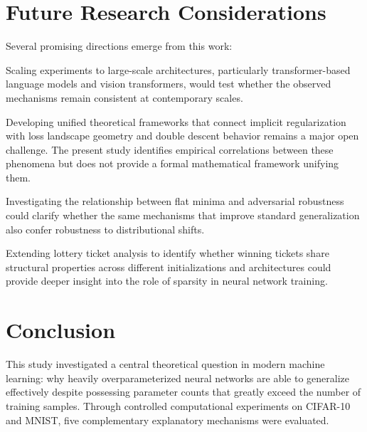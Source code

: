 \documentclass[conference]{IEEEtran}
\begin{document}
\section{Future Research Considerations}

Several promising directions emerge from this work:

Scaling experiments to large-scale architectures, particularly transformer-based language models and vision transformers, would test whether the observed mechanisms remain consistent at contemporary scales.

Developing unified theoretical frameworks that connect implicit regularization with loss landscape geometry and double descent behavior remains a major open challenge. The present study identifies empirical correlations between these phenomena but does not provide a formal mathematical framework unifying them.

Investigating the relationship between flat minima and adversarial robustness could clarify whether the same mechanisms that improve standard generalization also confer robustness to distributional shifts.

Extending lottery ticket analysis to identify whether winning tickets share structural properties across different initializations and architectures could provide deeper insight into the role of sparsity in neural network training.

\section{Conclusion}

This study investigated a central theoretical question in modern machine learning: why heavily overparameterized neural networks are able to generalize effectively despite possessing parameter counts that greatly exceed the number of training samples. Through controlled computational experiments on CIFAR-10 and MNIST, five complementary explanatory mechanisms were evaluated.
\end{document}
